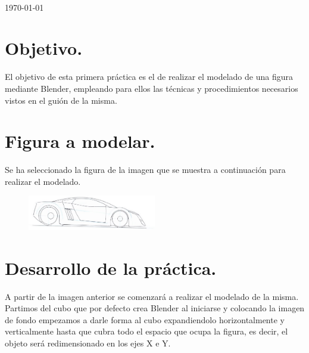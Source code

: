 \documentclass[10pt]{article}
\begin{document}
\begin{center}
 		\\																		%
\vspace{2cm} 																				
\begin{center}																					
{\large \today}																	%
 			\end{center}												  						
\end{center}							 											
																					
\newpage																		

\tableofcontents 

\newpage

\section{Objetivo.}

El objetivo de esta primera práctica es el de realizar el modelado de una figura mediante Blender, empleando para ellos las técnicas y procedimientos necesarios vistos en el guión de la misma.



\section{Figura a modelar.} 

Se ha seleccionado la figura de la imagen que se  muestra a continuación para realizar el modelado.

\begin{figure}[H]
	\begin{center}
	 		\includegraphics[width = 0.5\textwidth]{Imagenes/dibujoCoche.eps}
	\end{center} 
\end{figure}


\section{Desarrollo de la práctica.}


A partir de la imagen anterior se comenzará a realizar el modelado de la misma. Partimos del cubo que por defecto crea Blender al iniciarse y colocando la imagen de fondo empezamos a darle forma al cubo expandiendolo horizontalmente y verticalmente hasta que cubra todo el espacio que ocupa la figura, es decir, el objeto será redimensionado en los ejes X e Y.
\end{document}
